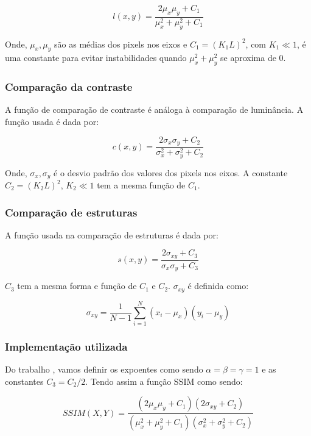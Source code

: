 \documentclass[10pt,a4paper]{article}
\begin{document}
\begin{equation}
    l(x,y) = \frac{2 \mu_x \mu_y + C_1}{\mu_x^2 + \mu_y^2 + C_1}
    \label{eq:lum}
\end{equation}

Onde, $\mu_x, \mu_y$ são as médias dos pixels nos eixos e $C_1 = (K_1L)^2$, com $K_1 \ll 1$, é uma constante para evitar instabilidades quando $\mu_x^2 + \mu_y^2$ se aproxima de $0$.

\subsubsection*{Comparação da contraste}
A função de comparação de contraste é análoga à comparação de luminância. A função usada é dada por:

\begin{equation}
    c(x,y) = \frac{2 \sigma_x \sigma_y + C_2}{\sigma_x^2 + \sigma_y^2 + C_2}
    \label{eq:cont}
\end{equation}

Onde, $\sigma_x, \sigma_y$ é o desvio padrão dos valores dos pixels nos eixos. A constante $C_2 = (K_2L)^2$, $K_2 \ll 1$ tem a mesma função de $C_1$.

\subsubsection*{Comparação de estruturas}
A função usada na comparação de estruturas é dada por:

\begin{equation}
    s(x,y) = \frac{2 \sigma_{xy} + C_3}{\sigma_x \sigma_y + C_3}
    \label{eq:estru}
\end{equation}

$C_3$ tem a mesma forma e função de $C_1$ e $C_2$. $\sigma_{xy}$ é definida como:

\begin{equation}
    \sigma_{xy} = \frac{1}{N - 1} \sum_{i = 1}^{N}(x_i - \mu_x)(y_i - \mu_y )
    \label{eq:sigmaxy}
\end{equation}

\subsubsection*{Implementação utilizada}
Do trabalho \cite{article}, vamos definir os expoentes como sendo $\alpha = \beta = \gamma = 1$ e as constantes $C_3 = C_2/2$. Tendo assim a função SSIM como sendo:

\begin{equation}
    \mathit{SSIM}(X,Y) = \frac{(2 \mu_x \mu_y + C_1) (2 \sigma_{xy} + C_2)}{(\mu_x^2 + \mu_y^2 + C_1)(\sigma_x^2 + \sigma_y^2 + C_2)}
    \label{eq:ssim}
\end{equation}
\end{document}
